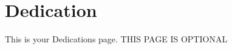 \documentclass[./dissertation.tex]{subfiles}
\begin{document}
  \chapter*{Dedication}

  This is your Dedications page. THIS PAGE IS OPTIONAL
\end{document}
